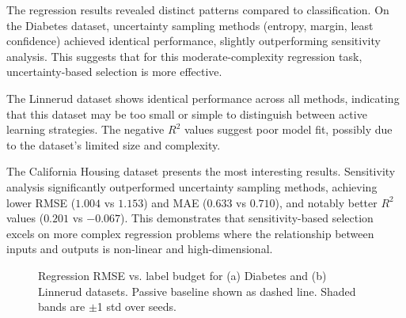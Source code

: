 \documentclass[conference]{IEEEtran}
\begin{document}
The regression results revealed distinct patterns compared to classification. On the Diabetes dataset, uncertainty sampling methods (entropy, margin, least confidence) achieved identical performance, slightly outperforming sensitivity analysis. This suggests that for this moderate-complexity regression task, uncertainty-based selection is more effective.

The Linnerud dataset shows identical performance across all methods, indicating that this dataset may be too small or simple to distinguish between active learning strategies. The negative $R^2$ values suggest poor model fit, possibly due to the dataset's limited size and complexity.

The California Housing dataset presents the most interesting results. Sensitivity analysis significantly outperformed uncertainty sampling methods, achieving lower RMSE ($1.004$ vs $1.153$) and MAE ($0.633$ vs $0.710$), and notably better $R^2$ values ($0.201$ vs $-0.067$). This demonstrates that sensitivity-based selection excels on more complex regression problems where the relationship between inputs and outputs is non-linear and high-dimensional.

\begin{figure}[t]
\centering
{}
\hfill
{}
\caption{Regression RMSE vs. label budget for (a) Diabetes and (b) Linnerud datasets. Passive baseline shown as dashed line. Shaded bands are $\pm$1 std over seeds.}
\label{fig:reg-compare}
\end{figure}
\end{document}

